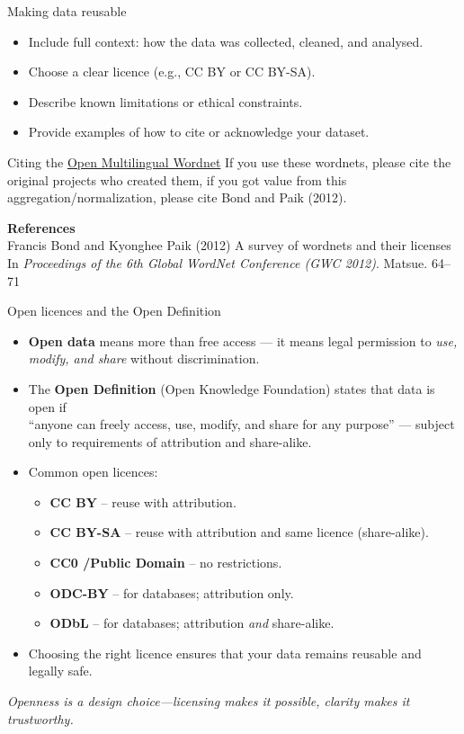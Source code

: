 \documentclass[aspectratio=169]{beamer}
\begin{document}
\begin{frame}{Making data reusable}
\begin{itemize}
  \item Include full context: how the data was collected, cleaned, and analysed.
  \item Choose a clear licence (e.g., CC BY or CC BY-SA).
  \item Describe known limitations or ethical constraints.  
  \item Provide examples of how to cite or acknowledge your dataset.
  \end{itemize}
  \begin{exampleblock}{Citing the \href{https://omwn.org/}{Open Multilingual Wordnet}}
  If you use these wordnets, please cite the original projects who created them, if you got value from this aggregation/normalization, please cite Bond and Paik (2012).
  \medskip
  
    \textbf{References} \\
Francis Bond and Kyonghee Paik (2012)
A survey of wordnets and their licenses In \textit{Proceedings of the 6th Global WordNet Conference (GWC 2012)}. Matsue. 64–71
\end{exampleblock}
  
\end{frame}
\begin{frame}{Open licences and the Open Definition}
\begin{itemize}
  \item \textbf{Open data} means more than free access — it means legal permission to \emph{use, modify, and share} without discrimination.  
  \item The \textbf{Open Definition} (Open Knowledge Foundation) states that data is open if \\
  “anyone can freely access, use, modify, and share for any purpose” 
  — subject only to requirements of attribution and share-alike.
  \item Common open licences:  
    \begin{itemize}
      \item \textbf{CC BY} – reuse with attribution.  
      \item \textbf{CC BY-SA} – reuse with attribution and same licence (share-alike).  
      \item \textbf{CC0 /Public Domain} – no restrictions.  
      \item \textbf{ODC-BY} – for databases; attribution only.
      \item \textbf{ODbL} – for databases; attribution \emph{and} share-alike.
    \end{itemize}
  \item Choosing the right licence ensures that your data remains reusable and legally safe.
\end{itemize}
\medskip
\textit{Openness is a design choice—licensing makes it possible, clarity makes it trustworthy.}
\end{frame}
\end{document}
